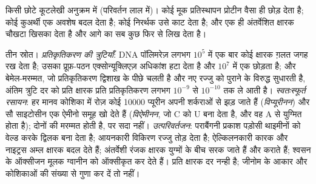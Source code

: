 \begin{omfigure}

{\small किसी छोटे कूटलेखी अनुक्रम में  (परिवर्तन लाल में)।
कोई मूक प्रतिस्थापन प्रोटीन वैसा ही छोड़ देता है; कोई कुअर्थी एक अवशेष
बदल देता है; कोई निरर्थक उसे काट देता है; और एक ही अंतर्वेशित क्षारक
चौखटा खिसका देता है और आगे का सब कुछ फिर से लिख देता है।}
\end{omfigure}

\begin{proposition}[उत्परिवर्तन कहाँ से आते हैं]\label{prop:b2:genome-diversification:sources}
तीन स्रोत। \emph{प्रतिकृतिकरण की त्रुटियाँ}: DNA पॉलिमरेज़ लगभग
$10^{5}$ में एक बार कोई क्षारक ग़लत जगह रख देता है; उसका प्रूफ़-पठन
एक्सोन्यूक्लिएज़ अधिकांश हटा देता है और $10^{7}$ में एक छोड़ता है; और
बेमेल-मरम्मत, जो प्रतिकृतिकरण द्विशाख के पीछे चलती है और नए रज्जु को
पुराने के विरुद्ध सुधारती है, अंतिम त्रुटि दर को प्रति क्षारक प्रति
प्रतिकृतिकरण लगभग $10^{-9}$ से $10^{-10}$ तक ले आती है।
\emph{स्वतःस्फूर्त रसायन}: हर मानव कोशिका में रोज़ कोई \num{10000}
प्यूरीन अपनी शर्कराओं से झड़ जाते हैं (\emph{विप्यूरीनन}) और सौ
साइटोसीन एक ऐमीनो समूह खो देते हैं (\emph{विऐमीनन}, जो C को U बना देता
है, और वह A से युग्मित होता है); दोनों की मरम्मत होती है, पर सदा नहीं।
\emph{उत्परिवर्तजन}: पराबैंगनी प्रकाश पड़ोसी थाइमीनों को वेल्ड करके
द्विलक बना देता है; आयनकारी विकिरण रज्जु तोड़ देता है; ऐल्किलनकारी कारक
और नाइट्रस अम्ल क्षारक बदल देते हैं; अंतर्वेशी रंजक क्षारक युग्मों के
बीच सरक जाते हैं और  कराते हैं; श्वसन के ऑक्सीजन मूलक
ग्वानीन को ऑक्सीकृत कर देते हैं। प्रति क्षारक दर नन्ही है; जीनोम के
आकार और कोशिकाओं की संख्या से गुणा कर दें तो नहीं।
\end{proposition}

